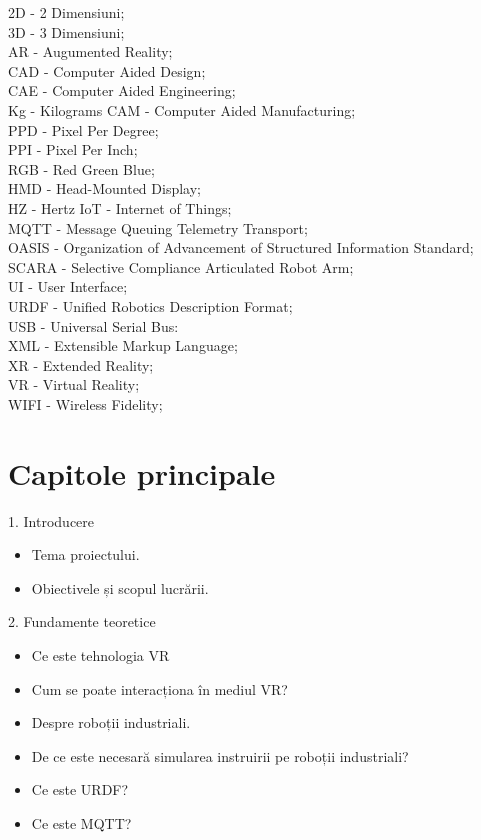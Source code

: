 \documentclass[a4paper,12pt]{report}
\begin{document}
\noindent 
2D - 2 Dimensiuni;\\
3D - 3 Dimensiuni; \\
AR - Augumented Reality;\\
CAD - Computer Aided Design;\\
CAE - Computer Aided Engineering;\\
Kg - Kilograms
CAM - Computer Aided Manufacturing;\\
PPD - Pixel Per Degree;\\
PPI - Pixel Per Inch;\\
RGB - Red Green Blue;\\
HMD - Head-Mounted Display; \\
HZ - Hertz
IoT - Internet of Things;\\
MQTT - Message Queuing Telemetry Transport;\\
OASIS - Organization of Advancement of Structured Information Standard;\\
SCARA - Selective Compliance Articulated Robot Arm;\\
UI - User Interface;\\
URDF - Unified Robotics Description Format;\\
USB - Universal Serial Bus:\\
XML - Extensible Markup Language;\\
XR - Extended Reality;\\
VR - Virtual Reality;\\
WIFI - Wireless Fidelity;\\

\clearpage

\section{Capitole principale }
1. Introducere
  \begin{itemize}
 
       \item  Tema proiectului.
       \item  Obiectivele și scopul lucrării. 
 \end{itemize}


2. Fundamente teoretice
  \begin{itemize}
 
       \item  Ce este tehnologia VR
       \item  Cum se poate interacționa în mediul VR?
       \item  Despre roboții industriali. 
        \item De ce este necesară simularea instruirii pe roboții industriali?
        \item Ce este URDF?
        \item Ce este MQTT?
 \end{itemize}
\end{document}
